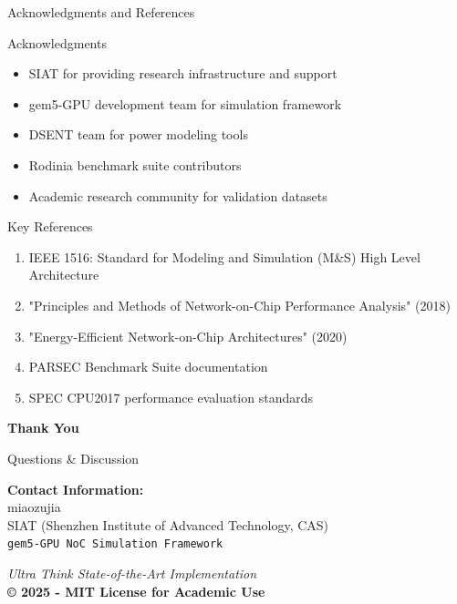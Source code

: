 \documentclass[10pt,aspectratio=169]{beamer}
\begin{document}
\begin{frame}{Acknowledgments and References}
    \begin{block}{Acknowledgments}
        \begin{itemize}
            \item SIAT for providing research infrastructure and support
            \item gem5-GPU development team for simulation framework
            \item DSENT team for power modeling tools
            \item Rodinia benchmark suite contributors
            \item Academic research community for validation datasets
        \end{itemize}
    \end{block}
    
    \begin{block}{Key References}
        \begin{enumerate}
            \item IEEE 1516: Standard for Modeling and Simulation (M\&S) High Level Architecture
            \item "Principles and Methods of Network-on-Chip Performance Analysis" (2018)
            \item "Energy-Efficient Network-on-Chip Architectures" (2020)
            \item PARSEC Benchmark Suite documentation
            \item SPEC CPU2017 performance evaluation standards
        \end{enumerate}
    \end{block}
\end{frame}

\begin{frame}[plain]
    \begin{center}
        \Huge \textbf{Thank You}
        
        \vspace{1cm}
        
        \Large Questions \& Discussion
        
        \vspace{1cm}
        
        \normalsize
        \textbf{Contact Information:} \\
        miaozujia \\
        SIAT (Shenzhen Institute of Advanced Technology, CAS) \\
        \texttt{gem5-GPU NoC Simulation Framework}
        
        \vspace{0.5cm}
        
        \textit{Ultra Think State-of-the-Art Implementation} \\
        \textbf{© 2025 - MIT License for Academic Use}
    \end{center}
\end{frame}
\end{document}
